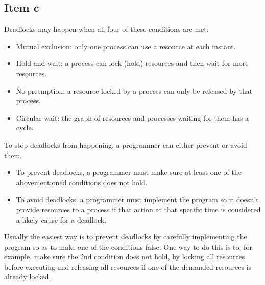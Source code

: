 {\subsection{Item c}
Deadlocks may happen when all four of these conditions are met:
\begin{itemize}
    \item Mutual exclusion: only one process can use a resource at each instant.
    \item Hold and wait: a process can lock (hold) resources and then wait for more resources.
    \item No-preemption: a resource locked by a process can only be released by that process.
    \item Circular wait: the graph of resources and processes waiting for them has a cycle.
\end{itemize}
To stop deadlocks from happening, a programmer can either prevent or avoid them.
\begin{itemize}
    \item To prevent deadlocks, a programmer must make sure at least one of the abovementioned conditions does not hold.
    \item To avoid deadlocks, a programmer must implement the program so it doesn't provide resources to a process if that action at that specific time is considered a likely cause for a deadlock.
\end{itemize}
Usually the easiest way is to prevent deadlocks by carefully implementing the program so as to make one of the conditions false. One way to do this is to, for example, make sure the 2nd condition does not hold, by locking all resources before executing and releasing all resources if one of the demanded resources is already locked.

}
